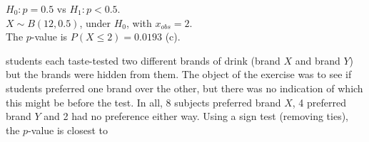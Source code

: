 \documentclass[bigtut]{tutorial}
\begin{document}
\begin{tutorial}
\begin{questions}
\begin{solution}
 $H_0: p=0.5$ vs $H_1: p < 0.5$. \\

 $X \sim B(12,0.5)$, under $H_0$, with $x_{obs} = 2$. \\

The $p$-value is $P(X \leq 2) = 0.0193$ (c).
\end{solution}


\vspace{1cm}
\hspace{-1cm}

 students each taste-tested two different brands of drink
(brand $X$ and brand $Y$) but the brands were hidden from them. The
object of the exercise was to see if students preferred one brand
over the other, but there was no indication of which this might be
before the test. In all, 8 subjects preferred brand $X$, 4 preferred
brand $Y$ and 2 had no preference either way. Using a sign test (removing ties), the $p$-value is closest to


\end{questions}
\end{tutorial}
\end{document}
